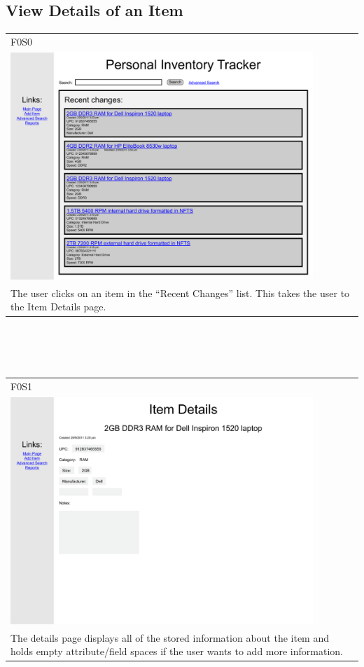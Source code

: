 \documentclass{article}
\begin{document}
\subsection{View Details of an Item}
\begin{tabular}{ p{4.5in} }
F0S0\\
\includegraphics[keepaspectratio, width=4.5in]{viewDetailsF0S0.pdf} \\
The user clicks on an item in the ``Recent Changes'' list. This takes the user to the Item Details page.
\end{tabular}\\
~\\
~\\
\begin{tabular}{ p{4.5in} }
F0S1\\
\includegraphics[keepaspectratio, width=4.5in]{viewDetailsF0S1.pdf} \\
The details page displays all of the stored information about the item and holds empty attribute/field spaces if the user wants to add more information.
\end{tabular}
\end{document}
